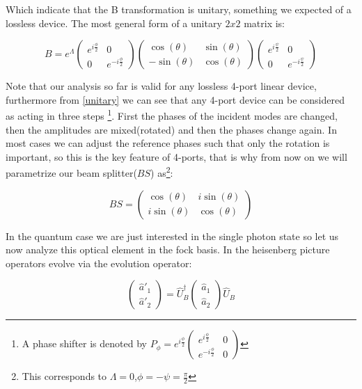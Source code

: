 \documentclass[11pt]{article}
\begin{document}
Which indicate that the B transformation is unitary, something we expected of a lossless device. The most general form of a unitary $2x2$ matrix is\cite{leonhardt}:


\begin{equation}
B=e^{\Lambda} \begin{pmatrix} e^{i\frac{\phi}{2}} & 0 \\ 0 & e^{-i\frac{\phi}{2}} \end{pmatrix} \begin{pmatrix} \cos(\theta) &  \sin(\theta) \\ - \sin(\theta) & \cos(\theta) \end{pmatrix} \begin{pmatrix} e^{i\frac{\psi}{2}} & 0 \\ 0 & e^{-i\frac{\psi}{2}} \end{pmatrix} \label{unitary}
\end{equation}

Note that our analysis so far is valid for any lossless 4-port linear device, furthermore from \ref{unitary} we can see that any 4-port device can be considered as acting in three steps \footnote{A phase shifter is denoted by $P_{\phi}=e^{i \frac{\phi}{2}}\begin{pmatrix}e^{i \frac{\phi}{2}} & 0 \\ e^{-i \frac{\phi}{2}} &0 \end{pmatrix}$}. First the phases of the incident modes are changed, then the amplitudes are mixed(rotated) and then the phases change again. In most cases we can adjust the reference phases such that only the rotation is important, so this is the key feature of 4-ports, that is why from now on we will parametrize our beam splitter($BS$) as\footnote{This corresponds to $\Lambda=0$,$\phi=-\psi=\frac{\pi}{2}$}:


\begin{equation} 
BS=\begin{pmatrix} \cos(\theta) & i \sin(\theta) \\ i \sin(\theta) & \cos(\theta) \end{pmatrix}
\end{equation}



In the quantum case we are just interested in the single photon state so let us now analyze this optical element in the fock basis. In the heisenberg picture operators evolve via the evolution operator:

\begin{equation}
\begin{pmatrix} \hat{a}'_{1} \\ \hat{a}'_{2}\end{pmatrix}=\hat{U}^{\dagger}_{B} \begin{pmatrix} \hat{a}_{1} \\ \hat{a}_{2}\end{pmatrix} \hat{U}_{B} 
\label{Heisenberg}
\end{equation}
\end{document}
